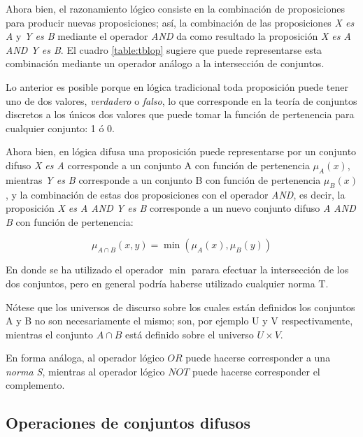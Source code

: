 Ahora bien, el razonamiento lógico consiste en la combinación de proposiciones para producir nuevas proposiciones; así, la combinación de las proposiciones \textit{X es A} y  \textit{Y es B} mediante el operador \textit{AND} da como resultado la proposición \textit{X es A AND Y es B}. El cuadro \ref{table:tblop} sugiere que puede representarse esta combinación mediante un operador análogo a la intersección de conjuntos.

Lo anterior es posible porque en lógica tradicional toda proposición puede tener uno de dos valores, \textit{verdadero} o \textit{falso}, lo que corresponde en la teoría de conjuntos discretos a los únicos dos valores que puede tomar la función de pertenencia para cualquier conjunto: 1 ó 0.


Ahora bien, en lógica difusa una proposición puede representarse por un conjunto difuso \textit{X es A} corresponde a un conjunto A con función de pertenencia $\mu_A(x)$, mientras \textit{Y es B} corresponde a un conjunto B con función de pertenencia $\mu_B(x)$, y la combinación de estas dos proposiciones con el operador \textit{AND}, es decir, la proposición \textit{X es A AND Y es B} corresponde a un nuevo conjunto difuso \textit{A AND B} con función de pertenencia:

\begin{displaymath}
\mu_{A \cap B}(x,y) =  \min(\mu_A(x),\mu_B(y))
\end{displaymath}

En donde se ha utilizado el operador $\min$ parara efectuar la intersección de los dos conjuntos, pero en general podría haberse utilizado cualquier norma T.

Nótese que los universos de discurso sobre los cuales están definidos los conjuntos A y B no son necesariamente el mismo; son, por ejemplo U y V respectivamente, mientras el conjunto $A \cap B$ está definido sobre el universo $U \times V$.

En forma análoga, al operador lógico $OR$ puede hacerse corresponder a una \textit{norma S}, mientras al operador lógico $NOT$ puede hacerse corresponder el complemento.









\subsection{Operaciones de conjuntos difusos}

